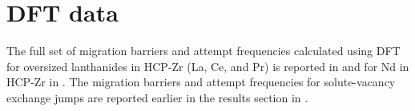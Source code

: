 \documentclass[preprint,12pt]{elsarticle}
\providecommand{\DIFdel}[1]{} %
\providecommand{\DIFaddbegin}{\protect\color{blue}} %
\providecommand{\DIFaddend}{\protect\color{black}} %
\providecommand{\DIFdelbegin}{\protect\color{red}} %
\providecommand{\DIFdelend}{\protect\color{black}} %
\newcommand{\DIFscaledelfig}{0.5}
\newlength{\DIFdelgraphicswidth} %
\newlength{\DIFdelgraphicsheight} %
\newcommand{\DIFaddincludegraphics}[2][]{{\color{blue}\fbox{\DIFOincludegraphics[#1]{#2}}}} %
\newcommand{\DIFdelincludegraphics}[2][]{%
\sbox{\DIFdelgraphicsbox}{\DIFOincludegraphics[#1]{#2}}%
\settoboxwidth{\DIFdelgraphicswidth}{\DIFdelgraphicsbox} %
\settoboxtotalheight{\DIFdelgraphicsheight}{\DIFdelgraphicsbox} %
\scalebox{\DIFscaledelfig}{%
\parbox[b]{\DIFdelgraphicswidth}{\usebox{\DIFdelgraphicsbox}\\[-\baselineskip] \rule{\DIFdelgraphicswidth}{0em}}\llap{\resizebox{\DIFdelgraphicswidth}{\DIFdelgraphicsheight}{%
\setlength{\unitlength}{\DIFdelgraphicswidth}%
\begin{picture}(1,1)%
\thicklines\linethickness{2pt} %
{\color[rgb]{1,0,0}\put(0,0){\framebox(1,1){}}}%
{\color[rgb]{1,0,0}\put(0,0){\line( 1,1){1}}}%
{\color[rgb]{1,0,0}\put(0,1){\line(1,-1){1}}}%
\end{picture}%
}\hspace*{3pt}}} %
} %
\DeclareRobustCommand{\DIFaddbegin}{\DIFOaddbegin \let\includegraphics\DIFaddincludegraphics} %
\DeclareRobustCommand{\DIFaddend}{\DIFOaddend \let\includegraphics\DIFOincludegraphics} %
\DeclareRobustCommand{\DIFdelbegin}{\DIFOdelbegin \let\includegraphics\DIFdelincludegraphics} %
\DeclareRobustCommand{\DIFdelend}{\DIFOaddend \let\includegraphics\DIFOincludegraphics} %
\begin{document}
\FloatBarrier
\section{DFT data}
\label{app:dft_data}
\DIFaddbegin 

\setcounter{figure}{0}
\setcounter{table}{0}

\DIFaddend The full set of migration barriers and attempt frequencies calculated using DFT for oversized lanthanides in HCP-Zr (La, Ce, and Pr) is reported in  and for Nd in HCP-Zr in .  The migration barriers and attempt frequencies for solute-vacancy exchange jumps are reported earlier in the results section in . 
\DIFdelbegin \DIFdel{The resulting diffusivities of the four lanthanides using all the atomistic data are plotted in \Cref{fig:diffusion_all_lanthanides}.
}\DIFdelend 
\end{document}
